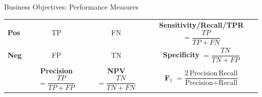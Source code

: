 \documentclass[10pt,compress,t,notes=noshow, xcolor=table]{beamer}
\begin{document}
\begin{frame}{Business Objectives: Performance Measures}
{\begin{tabular}{|l|cc|c|}
\textbf{Pos}
  & \cellcolor[gray]{0.9}\rule{0pt}{3.5ex}TP
  & \cellcolor[gray]{0.9}FN
  & \cellcolor[gray]{0.9}\rule{0pt}{3.5ex}%
    \textbf{Sensitivity/Recall/TPR }%
    $=\dfrac{TP}{TP+FN}$ \\

\textbf{Neg}
  & \cellcolor[gray]{0.9}\rule{0pt}{3.5ex}FP
  & \cellcolor[gray]{0.9}TN
  & \cellcolor[gray]{0.9}\rule{0pt}{3.5ex}%
    \textbf{Specificity }%
    $=\dfrac{TN}{TN+FP}$ \\[0.8ex]
\hline
  & \cellcolor[gray]{0.9}\rule{0pt}{3.5ex}
      \textbf{Precision} $=\dfrac{TP}{TP+FP}$
  & \cellcolor[gray]{0.9}\rule{0pt}{3.5ex}
      \textbf{NPV} $=\dfrac{TN}{TN+FN}$
  & \cellcolor[gray]{0.9}\rule{0pt}{3.5ex}
      \textbf{F$_1$}%
        $=\dfrac{2\,\text{Precision}\,\text{Recall}}%
                {\text{Precision}+\text{Recall}}$
                \\[0.8ex]
\hline
\end{tabular}
}


\end{frame}






\end{document}
